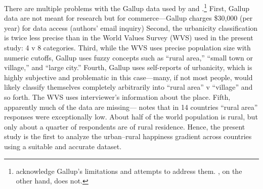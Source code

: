 \documentclass[11pt, letterpaper]{article}
\begin{document}

There are multiple problems with the Gallup data used by \citet{easterlin10al} and \citet{burger20}.\footnote{\citet{easterlin10al} acknowledge Gallup's limitations and attempts
to address them. \citet{burger20}, on the other hand, does not.}  First, Gallup
data are not meant for
research but for commerce---Gallup charges \$30,000 (per year) for data access%
  (authors'
email inquiry)%
 Second, the urbanicity classification is twice less precise than in the World Values Survey (WVS) used in the present study: 4
v 8 categories. Third, while the WVS uses precise population size with numeric cutoffs,
Gallup uses fuzzy concepts such as ``rural area,'' ``small town or village,'' and ``large city.''
Fourth, %
Gallup uses self-reports of urbanicity, which is highly
subjective and problematic in this case---many, if not most people, would likely
classify themselves completely arbitrarily into ``rural area'' v ``village'' and so forth. The WVS uses interviewer's information about the place. Fifth, apparently much of the data are missing---\citet{easterlin10al} notes that in 14 countries ``rural area'' responses were exceptionally low.
 About half of the world population is rural, but \citet{burger20} %
 only about a quarter of respondents are of rural residence.
%
 Hence, the present study is the first to analyze the urban--rural happiness gradient across countries using a suitable and accurate dataset. 
\end{document}
